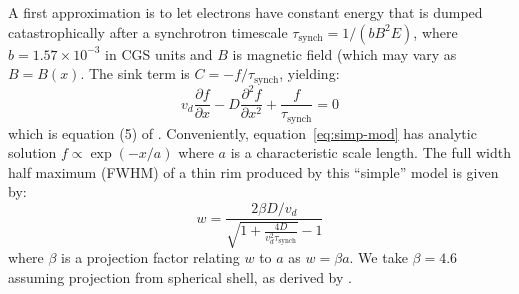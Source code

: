 \documentclass[iop, apj, numberedappendix, twocolappendix]{emulateapj}
\newcommand*{\mt}{\mathrm}
\newcommand*{\ptl}{\partial}
\newcommand*{\tsynch}{\tau_{\mt{synch}}}
\begin{document}
A first approximation is to let electrons have constant energy that is dumped
catastrophically after a synchrotron timescale $\tsynch = 1/(b B^2 E)$, where
$b = 1.57 \times 10^{-3}$ in CGS units and $B$ is magnetic field (which may
vary as $B=B(x)$.  The sink term is $C = -f / \tsynch$, yielding:
\begin{equation} \label{eq:simp-mod}
    v_d \frac{\ptl f}{\ptl x} - D \frac{\ptl^2 f}{\ptl x^2} +
    \frac{f}{\tau_{\mt{synch}}} = 0
\end{equation}
which is equation (5) of .
Conveniently, equation~\eqref{eq:simp-mod} has analytic solution $f \propto
\exp(-x/a)$ where $a$ is a characteristic scale length.  The full width half
maximum (FWHM) of a thin rim produced by this ``simple'' model is given by:
\begin{equation} \label{eq;simp-fwhm}
    w = \frac{2\beta D / v_d}{\sqrt{1 +\frac{4D}{v_d^2 \tsynch}} - 1}
\end{equation}
where $\beta$ is a projection factor relating $w$ to $a$ as $w = \beta a$.  We
take $\beta = 4.6$ assuming projection from spherical shell, as derived by
\citet{ballet2006}.
\end{document}
